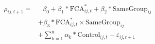 \begin{equation}
\begin{split}
\rho_{ij,t+1} = & \text{ 	}\beta_0 + \beta_1* \text{FCA}^*_{ij,t} + \beta_2* \text{SameGroup}_{ij} \\
 &	+\beta_3* \text{FCA}^*_{ij,t} \times \text{SameGroup}_{ij}   \\
  & + \sum_{k=1} ^{n} \alpha_k*\text{Control}_{ij,t} + \varepsilon_{ij,t+1}
\end{split}
\label{model1}
\end{equation}